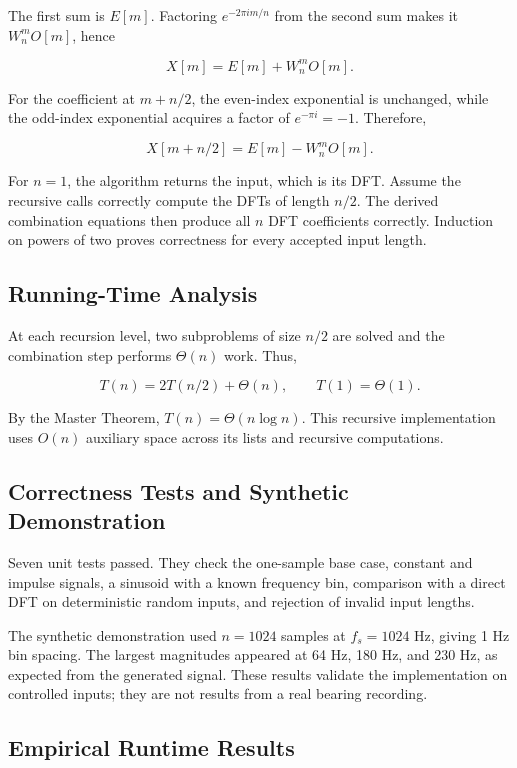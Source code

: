 \documentclass[conference]{IEEEtran}
\begin{document}
The first sum is $E[m]$. Factoring $e^{-2\pi i m/n}$ from the second
sum makes it $W_n^mO[m]$, hence

\[
X[m]=E[m]+W_n^mO[m].
\]

For the coefficient at $m+n/2$, the even-index exponential is
unchanged, while the odd-index exponential acquires a factor of
$e^{-\pi i}=-1$. Therefore,

\[
X[m+n/2]=E[m]-W_n^mO[m].
\]

For $n=1$, the algorithm returns the input, which is its DFT. Assume
the recursive calls correctly compute the DFTs of length $n/2$.
The derived combination equations then produce all $n$ DFT
coefficients correctly. Induction on powers of two proves correctness
for every accepted input length.

\subsection{Running-Time Analysis}

At each recursion level, two subproblems of size $n/2$ are solved
and the combination step performs $\Theta(n)$ work. Thus,

\[
T(n)=2T(n/2)+\Theta(n),
\qquad T(1)=\Theta(1).
\]

By the Master Theorem, $T(n)=\Theta(n\log n)$. This recursive
implementation uses $O(n)$ auxiliary space across its lists and
recursive computations.

\subsection{Correctness Tests and Synthetic Demonstration}

Seven unit tests passed. They check the one-sample base case,
constant and impulse signals, a sinusoid with a known frequency bin,
comparison with a direct DFT on deterministic random inputs, and
rejection of invalid input lengths.

The synthetic demonstration used $n=1024$ samples at $f_s=1024$ Hz,
giving 1 Hz bin spacing. The largest magnitudes appeared at 64 Hz,
180 Hz, and 230 Hz, as expected from the generated signal. These
results validate the implementation on controlled inputs; they are
not results from a real bearing recording.

\subsection{Empirical Runtime Results}
\end{document}

